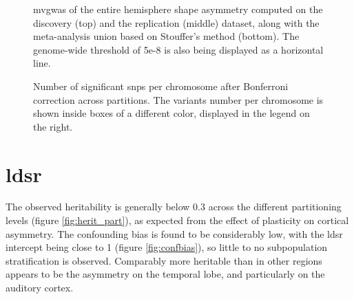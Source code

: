 \begin{figure}[H]
	\centering
	\subfloat{
		
	}
	\par\medskip
	\centering
	\subfloat{
			
	}
	\par\medskip
	\centering
	\subfloat{
			
	}
	\caption[mvGWAS of the entire hemisphere shape asymmetry]{\Ac{mvgwas} of the entire hemisphere shape asymmetry computed on the discovery (top) and the replication (middle) dataset, along with the meta-analysis union based on Stouffer's method (bottom). The genome-wide threshold of 5e-8 is also being displayed as a horizontal line.}
	\label{fig:entire_gwas}
\end{figure}


\begin{figure}[H]
	\begin{adjustwidth}{-4cm}{-3cm}
	\centering
	\subfloat{
		
	}
	\subfloat{
		
	}
	\end{adjustwidth}	
	\caption[Number of significant SNPs after Bonferroni correction along partitions]{Number of significant \acp{snp} per chromosome after Bonferroni correction across partitions. The variants number per chromosome is shown inside boxes of a different color, displayed in the legend on the right.}
	\label{fig:part_bonferroni}
\end{figure}

\section{\ac{ldsr}}
\label{subsec:ldsr_results}
The observed heritability is generally below 0.3 across the different partitioning levels (figure \autoref{fig:herit_part}), as expected from the effect of plasticity on cortical asymmetry. The confounding bias is found to be considerably low, with the \ac{ldsr} intercept being close to 1 \cite{Bulik-Sullivan2015} (figure \autoref{fig:confbias}), so little to no subpopulation stratification is observed. Comparably more heritable than in other regions appears to be the asymmetry on the temporal lobe, and particularly on the auditory cortex.


